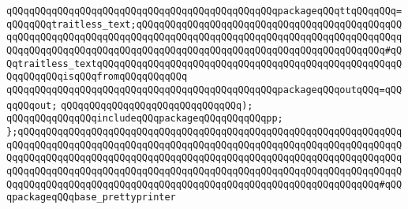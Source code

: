 \verb|qQQqqQQqqQQqqQQqqQQqqQQqqQQqqQQqqQQqqQQqqQQqqQQqpackageqQQqttqQQqqQQq=qQQqqQQqtraitless_text;qQQqqQQqqQQqqQQqqQQqqQQqqQQqqQQqqQQqqQQqqQQqqQQqqQQqqQQqqQQqqQQqqQQqqQQqqQQqqQQqqQQqqQQqqQQqqQQqqQQqqQQqqQQqqQQqqQQqqQQqqQQqqQQqqQQqqQQqqQQqqQQqqQQqqQQqqQQqqQQqqQQqqQQqqQQqqQQqqQQqqQQq#qQQqtraitless_textqQQqqQQqqQQqqQQqqQQqqQQqqQQqqQQqqQQqqQQqqQQqqQQqqQQqqQQqqQQqqQQqisqQQqfromqQQqqQQqqQQq|\newline
\verb|qQQqqQQqqQQqqQQqqQQqqQQqqQQqqQQqqQQqqQQqqQQqqQQqpackageqQQqoutqQQq=qQQqqQQqout;|\newline
\verb|qQQqqQQqqQQqqQQqqQQqqQQqqQQqqQQq);|\newline
\newline
\verb|qQQqqQQqqQQqqQQqincludeqQQqpackageqQQqqQQqqQQqpp;|\newline
\verb|};qQQqqQQqqQQqqQQqqQQqqQQqqQQqqQQqqQQqqQQqqQQqqQQqqQQqqQQqqQQqqQQqqQQqqQQqqQQqqQQqqQQqqQQqqQQqqQQqqQQqqQQqqQQqqQQqqQQqqQQqqQQqqQQqqQQqqQQqqQQqqQQqqQQqqQQqqQQqqQQqqQQqqQQqqQQqqQQqqQQqqQQqqQQqqQQqqQQqqQQqqQQqqQQqqQQqqQQqqQQqqQQqqQQqqQQqqQQqqQQqqQQqqQQqqQQqqQQqqQQqqQQqqQQqqQQqqQQqqQQqqQQqqQQqqQQqqQQqqQQqqQQqqQQqqQQqqQQqqQQqqQQqqQQqqQQqqQQqqQQqqQQq#qQQqpackageqQQqbase_prettyprinter|\newline
\newline

